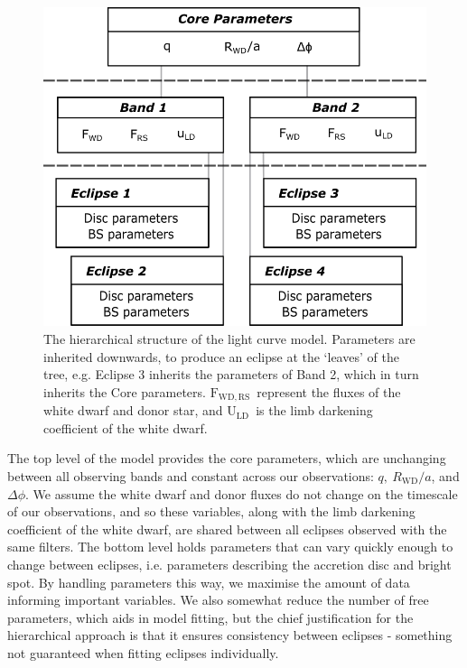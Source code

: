 \begin{figure}
    \centering
    \includegraphics[width=.85\columnwidth ]{figures/results/three_cvs_with_weird_colours/GeneralFigs/hierarchical_model_structure.png}
    \caption{The hierarchical structure of the light curve model. Parameters are inherited downwards, to produce an eclipse at the `leaves' of the tree, e.g. Eclipse 3 inherits the parameters of Band 2, which in turn inherits the Core parameters. $\mathrm{F_{WD, RS}}$\ represent the fluxes of the white dwarf and donor star, and $\mathrm{U_{LD}}$\ is the limb darkening coefficient of the white dwarf.}
    \label{fig:modelling:hierarchical_model}
\end{figure}

The top level of the model provides the core parameters, which are unchanging between all observing bands and constant across our observations: $q,\ R_\mathrm{WD}/a$, and $\Delta\phi$. We assume the white dwarf and donor fluxes do not change on the timescale of our observations, and so these variables, along with the limb darkening coefficient of the white dwarf, are shared between all eclipses observed with the same filters. The bottom level holds parameters that can vary quickly enough to change between eclipses, i.e. parameters describing the accretion disc and bright spot. By handling parameters this way, we maximise the amount of data informing important variables. We also somewhat reduce the number of free parameters, which aids in model fitting, but the chief justification for the hierarchical approach is that it ensures consistency between eclipses - something not guaranteed when fitting eclipses individually.

